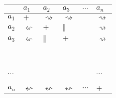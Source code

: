 \documentclass[10pt,a4paper]{report}
\begin{document}
\begin{tabular}{| p{3.0mm} | p{3.0mm} | p{3.0mm} | p{3.0mm} | p{3.0mm} | p{3.0mm} |}

  \hline
        & $a_1$ & $a_2$ & $a_3$ & $\cdots$ & $a_n$ \\
  \hline
  $a_1$ & $+$ & $\rightsquigarrow$ & $\rightsquigarrow$ &  & $\rightsquigarrow$ \\
  \hline
  $a_2$ & $\leftsquigarrow$  & $+$ & $\Vert$ & & $\rightsquigarrow$ \\
  \hline
  $a_3$ & $\leftsquigarrow$  & $\Vert$  & $+$ &&  $\rightsquigarrow$ \\
  \hline
  ~\begin{turn}{90}$\cdots$\end{turn}   &   &   &   &  & ~\begin{turn}{90}$\cdots$\end{turn} \\
  \hline
  $a_n$ & $\leftsquigarrow$  &  $\leftsquigarrow$ & $\leftsquigarrow$   &  $\cdots$  &  $+$  \\
 
  
  \hline
\end{tabular}
\end{document}
